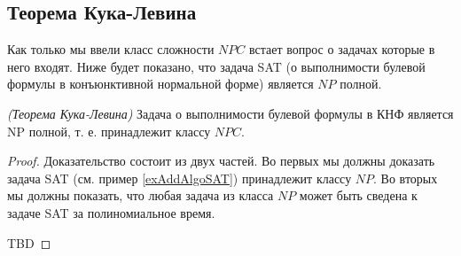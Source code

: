 \subsection{Теорема Кука-Левина}

Как только мы ввели класс сложности $NPC$ встает вопрос о задачах
которые в него входят. Ниже будет показано, что задача SAT (о
выполнимости булевой формулы в конъюнктивной нормальной форме)
является $NP$ полной.  

\begin{theorem}
\emph{(Теорема Кука-Левина)}
Задача о выполнимости булевой формулы в КНФ является NP полной,
т. е. принадлежит классу $NPC$.
\label{theoremAddAlgoCookTheorem}
\end{theorem}

\begin{proof}
  Доказательство состоит из двух частей. Во первых мы должны доказать
  задача SAT (см. пример \ref{exAddAlgoSAT}) принадлежит классу
  $NP$. Во вторых мы должны показать, что любая задача из класса $NP$
  может быть сведена к задаче SAT за полиномиальное время.

  

  TBD
\end{proof}

